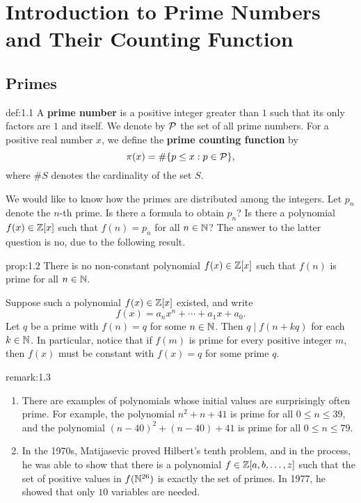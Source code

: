 \section{Introduction to Prime Numbers and Their Counting Function}\label{sec:1}

\subsection{Primes}\label{subsec:1.1}

\vspace{2ex}
\begin{defn}{def:1.1}
A {\bf prime number} is a positive integer greater than $1$ such that its only factors are $1$ and 
itself. We denote by ${\cal P}$ the set of all prime numbers. For a positive real number $x$, 
we define the {\bf prime counting function} by 
\[ \pi(x) = \#\{p \leq x : p \in {\cal P}\}, \]
where $\#S$ denotes the cardinality of the set $S$. 
\end{defn}

We would like to know how the primes are distributed among the integers. Let $p_n$ denote the 
$n$-th prime. Is there a formula to obtain $p_n$? Is there a polynomial $f(x) \in \mathbb{Z}[x]$ such that 
$f(n) = p_n$ for all $n \in \mathbb{N}$? The answer to the latter question is no, due to the following result. 

\begin{prop}{prop:1.2}
There is no non-constant polynomial $f(x) \in \mathbb{Z}[x]$ such that $f(n)$ is prime for all $n \in \mathbb{N}$. 
\end{prop}
\begin{pf}
Suppose such a polynomial $f(x) \in \mathbb{Z}[x]$ existed, and write 
\[ f(x) = a_n x^n + \cdots + a_1 x + a_0. \]
Let $q$ be a prime with $f(n) = q$ for some $n \in \mathbb{N}$. Then $q \mid f(n+kq)$ for each $k \in \mathbb{N}$. 
In particular, notice that if $f(m)$ is prime for every positive integer $m$, then $f(x)$ must be 
constant with $f(x) = q$ for some prime $q$. 
\end{pf}

\begin{remark}{remark:1.3}
\begin{enumerate}[(1)]
    \item There are examples of polynomials whose initial values are surprisingly often prime. 
    For example, the polynomial $n^2 + n + 41$ is prime for all $0 \leq n \leq 39$, and the 
    polynomial $(n-40)^2 + (n-40) + 41$ is prime for all $0 \leq n \leq 79$. 
    \item In the 1970s, Matijasevic proved Hilbert's tenth problem, and in the process, he was able to
    show that there is a polynomial $f \in \mathbb{Z}[a, b, \dots, z]$ such that the set of positive 
    values in $f(\mathbb{N}^{26})$ is exactly the set of primes. In 1977, he showed that only $10$ variables 
    are needed.
\end{enumerate}
\end{remark}

